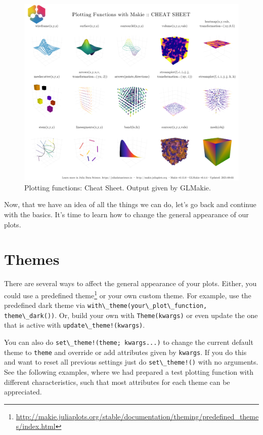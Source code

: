 \documentclass[
  notoc %
]{tufte-book}
\DeclareRobustCommand{\href}[2]{#2\footnote{\url{#1}}}
\newcommand{\passthrough}[1]{#1}
\begin{document}
\begin{figure}
\hypertarget{fig:cheat_sheet_glmakie}{%
\centering
\includegraphics{images/GLMakiePlottingFunctionsHide.png}
\caption{Plotting functions: Cheat Sheet. Output given by
GLMakie.}\label{fig:cheat_sheet_glmakie}
}
\end{figure}

Now, that we have an idea of all the things we can do, let's go back and
continue with the basics. It's time to learn how to change the general
appearance of our plots.

\hypertarget{sec:themes}{%
\section{Themes}\label{sec:themes}}

There are several ways to affect the general appearance of your plots.
Either, you could use a
\href{http://makie.juliaplots.org/stable/documentation/theming/predefined_themes/index.html}{predefined
theme} or your own custom theme. For example, use the predefined dark
theme via
\passthrough{\lstinline!with\_theme(your\_plot\_function, theme\_dark())!}.
Or, build your own with \passthrough{\lstinline!Theme(kwargs)!} or even
update the one that is active with
\passthrough{\lstinline"update\_theme!(kwargs)"}.

You can also do \passthrough{\lstinline"set\_theme!(theme; kwargs...)"}
to change the current default theme to \passthrough{\lstinline!theme!}
and override or add attributes given by
\passthrough{\lstinline!kwargs!}. If you do this and want to reset all
previous settings just do \passthrough{\lstinline"set\_theme!()"} with
no arguments. See the following examples, where we had prepared a test
plotting function with different characteristics, such that most
attributes for each theme can be appreciated.
\end{document}
